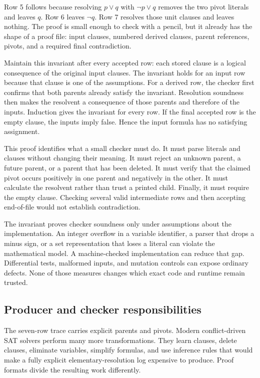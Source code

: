 Row 5 follows because resolving \(p\lor q\) with
\(\neg p\lor q\) removes the two pivot literals and leaves \(q\). Row 6 leaves
\(\neg q\). Row 7 resolves those unit clauses and leaves nothing. The proof is
small enough to check with a pencil, but it already has the shape of a proof
file: input clauses, numbered derived clauses, parent references, pivots, and a
required final contradiction.

\begin{proofkit}[title={Reader proof: an accepted resolution trace is sound}]
Maintain this invariant after every accepted row: each stored clause is a
logical consequence of the original input clauses. The invariant holds for an
input row because that clause is one of the assumptions. For a derived row,
the checker first confirms that both parents already satisfy the invariant.
Resolution soundness then makes the resolvent a consequence of those parents
and therefore of the inputs. Induction gives the invariant for every row. If
the final accepted row is the empty clause, the inputs imply false. Hence the
input formula has no satisfying assignment.
\end{proofkit}

This proof identifies what a small checker must do. It must parse literals and
clauses without changing their meaning. It must reject an unknown parent, a
future parent, or a parent that has been deleted. It must verify that the
claimed pivot occurs positively in one parent and negatively in the other. It
must calculate the resolvent rather than trust a printed child. Finally, it
must require the empty clause. Checking several valid intermediate rows and
then accepting end-of-file would not establish contradiction.

The invariant proves checker soundness only under assumptions about the
implementation. An integer overflow in a variable identifier, a parser that
drops a minus sign, or a set representation that loses a literal can violate
the mathematical model. A machine-checked implementation can reduce that
gap. Differential tests, malformed inputs, and mutation controls can expose
ordinary defects. None of those measures changes which exact code and runtime
remain trusted.

\subsection{Producer and checker responsibilities}

The seven-row trace carries explicit parents and pivots. Modern
conflict-driven SAT solvers perform many more transformations. They learn
clauses, delete clauses, eliminate variables, simplify formulas, and use
inference rules that would make a fully explicit elementary-resolution log
expensive to produce. Proof formats divide the resulting work differently.

